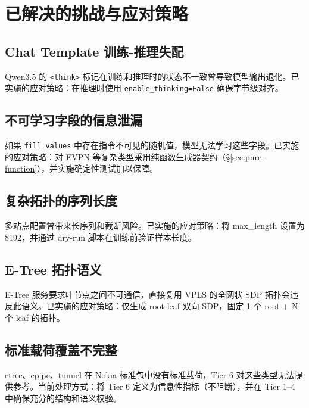 \documentclass[12pt, a4paper]{article}
\newcommand{\fillvalues}{\texttt{fill\_values}}
\begin{document}
\section{已解决的挑战与应对策略}
\label{sec:challenges}

\subsection{Chat Template 训练-推理失配}

Qwen3.5 的 \texttt{<think>} 标记在训练和推理时的状态不一致曾导致模型输出退化。已实施的应对策略：在推理时使用 \texttt{enable\_thinking=False} 确保字节级对齐。

\subsection{不可学习字段的信息泄漏}

如果 \fillvalues{} 中存在指令不可见的随机值，模型无法学习这些字段。已实施的应对策略：对 EVPN 等复杂类型采用纯函数生成器契约（\S\ref{sec:pure-function}），并实施确定性测试加以保障。

\subsection{复杂拓扑的序列长度}

多站点配置曾带来长序列和截断风险。已实施的应对策略：将 max\_length 设置为 8192，并通过 dry-run 脚本在训练前验证样本长度。

\subsection{E-Tree 拓扑语义}

E-Tree 服务要求叶节点之间不可通信，直接复用 VPLS 的全网状 SDP 拓扑会违反此语义。已实施的应对策略：仅生成 root-leaf 双向 SDP，固定 1 个 root + N 个 leaf 的拓扑。

\subsection{标准载荷覆盖不完整}

etree、cpipe、tunnel 在 Nokia 标准包中没有标准载荷，Tier 6 对这些类型无法提供参考。当前处理方式：将 Tier 6 定义为信息性指标（不阻断），并在 Tier 1--4 中确保充分的结构和语义校验。

\end{document}
